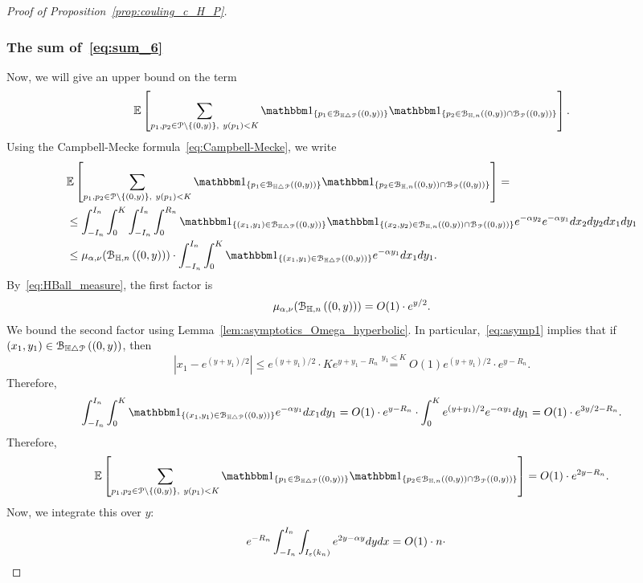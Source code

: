 \begin{proof}[Proof of Proposition~\ref{prop:couling_c_H_P}]
\subsubsection*{The sum of~\eqref{eq:sum_6}}
Now, we will give an upper  bound on the term
\begin{equation*}
\Exp { \sum_{p_1,p_2 \in\Pcal \setminus \{(0,y)\}, \ y(p_1) < K}
\ind{p_1\in \BallSym{(0,y)}} \ind{p_2\in \BallHyp{(0,y)}\cap \BallPo{(0,y)}}}.
\end{equation*}
Using the Campbell-Mecke formula~\eqref{eq:Campbell-Mecke}, we write 
\begin{equation*}
\begin{split}
&\Exp { \sum_{p_1,p_2 \in\Pcal \setminus \{(0,y)\}, \ y(p_1) < K}
\ind{p_1\in \BallSym{(0,y)}} \ind{p_2\in \BallHyp{(0,y)}\cap \BallPo{(0,y)}}} =\\
&\leq \int_{-I_n}^{I_n} \int_0^K \int_{-I_n}^{I_n} \int_0^{R_n} 
\ind{(x_1,y_1) \in \BallSym{(0,y)}} 
 \ind{(x_2,y_2) \in \BallHyp{(0,y)}\cap \BallPo{(0,y)}} e^{-\alpha y_2} e^{-\alpha y_1} 
 dx_2 dy_2 dx_1 dy_1 \\
 &\leq  \mu_{\alpha, \nu} (\BallHyp{(0,y)})\cdot
 \int_{-I_n}^{I_n} \int_0^K \ind{(x_1,y_1) \in \BallSym{(0,y)}} 
e^{-\alpha y_1}  dx_1 dy_1.
\end{split}
\end{equation*}
By~\eqref{eq:HBall_measure},  the first factor is 
$$ \mu_{\alpha, \nu} ({\mathcal B}_{\mathbb{H},n}\left((0,y)\right)) =O(1) \cdot e^{y/2}. $$ 
We bound the second factor using Lemma~\ref{lem:asymptotics_Omega_hyperbolic}. 
In particular,~\eqref{eq:asymp1} implies that 
if $(x_1,y_1) \in {\mathcal B}_{\mathbb{H} \bigtriangleup {\mathcal P}}\left((0,y)\right)$, then 
$$ |x_1 - e^{(y+y_1)/2} |\leq e^{(y+y_1)/2} \cdot K e^{y+y_1- R_n} \stackrel{y_1<K}{=} O(1) 
e^{(y+y_1)/2} \cdot e^{y- R_n}.$$
Therefore, 
$$ \int_{-I_n}^{I_n} \int_0^K \ind{(x_1,y_1) \in \BallSym{(0,y)}} 
e^{-\alpha y_1}  dx_1 dy_1 = O(1) \cdot e^{y-R_n} 
\cdot \int_0^K e^{(y+y_1)/2} 
e^{-\alpha y_1}   dy_1 = O(1)\cdot e^{3y/2 - R_n}. 
$$
Therefore, 
\begin{equation*}
\begin{split}
\Exp { \sum_{p_1,p_2 \in\Pcal \setminus \{(0,y)\}, \ y(p_1) < K}
\ind{p_1\in \BallSym{(0,y)}} \ind{p_2\in \BallHyp{(0,y)}\cap \BallPo{(0,y)}}} =
O(1) \cdot e^{2y - R_n}.
\end{split}
\end{equation*}
Now, we integrate this over $y$: 
\begin{equation*}
\begin{split}
&e^{-R_n} \int_{-I_n}^{I_n} \int_{I_\eps (k_n)} e^{2y -\alpha y} dy dx = O(1) \cdot n \cdot 

\end{split}
\end{equation*}
\end{proof}
